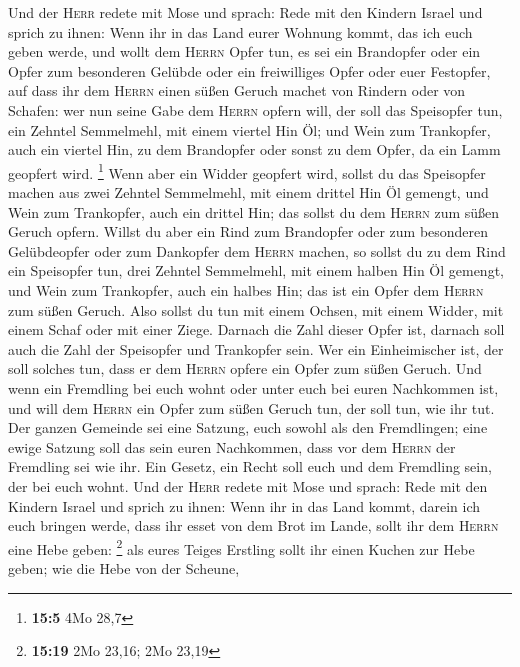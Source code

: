  Und der \textsc{Herr} redete mit Mose und sprach:
 Rede mit den Kindern Israel und sprich zu ihnen: Wenn ihr
in das Land eurer Wohnung kommt, das ich euch geben werde,
 und wollt dem \textsc{Herrn} Opfer tun, es sei ein
Brandopfer oder ein Opfer zum besonderen Gelübde oder ein freiwilliges
Opfer oder euer Festopfer, auf dass ihr dem \textsc{Herrn} einen süßen
Geruch machet von Rindern oder von Schafen:  wer nun seine
Gabe dem \textsc{Herrn} opfern will, der soll das Speisopfer tun, ein
Zehntel Semmelmehl, mit einem viertel Hin Öl;  und Wein
zum Trankopfer, auch ein viertel Hin, zu dem Brandopfer oder sonst zu
dem Opfer, da ein Lamm geopfert wird. \footnote{\textbf{15:5} 4Mo 28,7}
 Wenn aber ein Widder geopfert wird, sollst du das
Speisopfer machen aus zwei Zehntel Semmelmehl, mit einem drittel Hin Öl
gemengt,  und Wein zum Trankopfer, auch ein drittel Hin;
das sollst du dem \textsc{Herrn} zum süßen Geruch opfern. 
Willst du aber ein Rind zum Brandopfer oder zum besonderen Gelübdeopfer
oder zum Dankopfer dem \textsc{Herrn} machen,  so sollst
du zu dem Rind ein Speisopfer tun, drei Zehntel Semmelmehl, mit einem
halben Hin Öl gemengt,  und Wein zum Trankopfer, auch ein
halbes Hin; das ist ein Opfer dem \textsc{Herrn} zum süßen Geruch.
 Also sollst du tun mit einem Ochsen, mit einem Widder,
mit einem Schaf oder mit einer Ziege.  Darnach die Zahl
dieser Opfer ist, darnach soll auch die Zahl der Speisopfer und
Trankopfer sein.  Wer ein Einheimischer ist, der soll
solches tun, dass er dem \textsc{Herrn} opfere ein Opfer zum süßen
Geruch.  Und wenn ein Fremdling bei euch wohnt oder unter
euch bei euren Nachkommen ist, und will dem \textsc{Herrn} ein Opfer zum
süßen Geruch tun, der soll tun, wie ihr tut.  Der ganzen
Gemeinde sei eine Satzung, euch sowohl als den Fremdlingen; eine ewige
Satzung soll das sein euren Nachkommen, dass vor dem \textsc{Herrn} der
Fremdling sei wie ihr.  Ein Gesetz, ein Recht soll euch
und dem Fremdling sein, der bei euch wohnt.  Und der
\textsc{Herr} redete mit Mose und sprach:  Rede mit den
Kindern Israel und sprich zu ihnen: Wenn ihr in das Land kommt, darein
ich euch bringen werde,  dass ihr esset von dem Brot im
Lande, sollt ihr dem \textsc{Herrn} eine Hebe geben: \footnote{\textbf{15:19}
  2Mo 23,16; 2Mo 23,19}  als eures Teiges Erstling sollt
ihr einen Kuchen zur Hebe geben; wie die Hebe von der Scheune,
